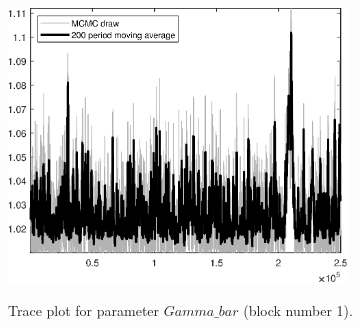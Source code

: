 \begin{figure}[H]
\centering
  \includegraphics[width=0.8\textwidth]{directed_search_est/graphs/TracePlot_Gamma_bar_blck_1}\\
    \caption{Trace plot for parameter $Gamma\_bar$ (block number 1).}
\end{figure}
